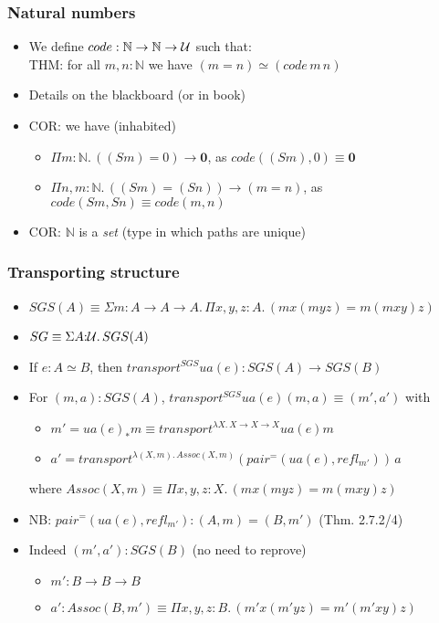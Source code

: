 \documentclass[handout]{beamer}
\newcommand{\depi}[3]{\Pi{#1{:}#2.\,#3}}
\newcommand{\sigm}[3]{\Sigma{#1{:}#2.\,#3}}
\newcommand{\lam}[2]{\lambda{#1.\,#2}}
\newcommand{\Nat}{\mathbb{N}}
\newcommand{\UU}{{\cal U}}
\newcommand{\bfnull}{\mathbf{0}}
\begin{document}
 \frame
  {

    \frametitle{Natural numbers}

    \begin{itemize}[<+->]
    \item We define $code: \Nat \to\Nat \to\UU$ such that:\\    
    THM: for all $m,n:\Nat$ we have $(m=n)\simeq(code\,m\,n)$
    \item Details on the blackboard (or in book)
    \item COR: we have (inhabited)
      \begin{itemize}[<+->]
      \item $\depi{m}{\Nat}{((Sm)=0) \to \bfnull}$, as $code((Sm),0) \equiv \bfnull$
      \item $\depi{n,m}{\Nat}{((Sm)=(Sn))\to(m=n)}$, as $code(Sm,Sn) \equiv code(m,n)$
      \end{itemize}
    \item COR: $\Nat$ is a \emph{set} (type in which paths are unique)
    \end{itemize}
  }


 \frame
  {

    \frametitle{Transporting structure}

    \begin{itemize}[<+->]
    \item $SGS(A) \equiv \sigm{m}{A{\to}A{\to}A}{\depi{x,y,z}{A}{(mx(myz)= m(mxy)z)}}$
    \item $SG \equiv \sigm{A}{\UU}{SGS(A)}$
    \item If $e: A\simeq B$, then $transport^{SGS} ua(e): SGS(A) \to SGS(B)$
    \item For $(m,a):SGS(A)$, $transport^{SGS} ua(e)(m,a)\equiv(m',a')$ with
      \begin{itemize}[<+->]
      \item $m'=ua(e)_* m \equiv transport^{\lam{X}{X{\to}X{\to}X}} ua(e) m$
      \item $a'=transport^{\lam{(X,m)}{Assoc(X,m)}}(pair^=(ua(e),refl_{m'}))\,a$
      \end{itemize}
      where $Assoc(X,m)\equiv\depi{x,y,z}{X}{(mx(myz)= m(mxy)z)}$
    \item NB: $pair^=(ua(e),refl_{m'}) : (A,m) = (B,m')$ (Thm. 2.7.2/4)
    \item Indeed $(m',a'):SGS(B)$ (no need to reprove)
      \begin{itemize}[<+->]
      \item $m': B\to B \to B$
      \item $a': Assoc(B,m')\equiv\depi{x,y,z}{B}{(m'x(m'yz)= m'(m'xy)z)}$
      \end{itemize}
    \end{itemize}
  }
\end{document}
